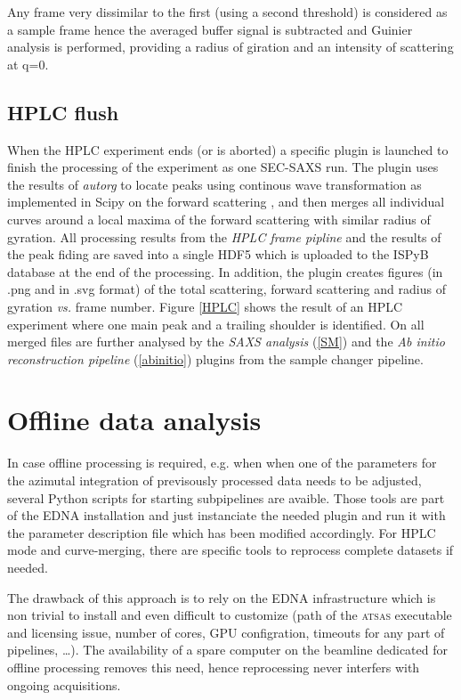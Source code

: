 \documentclass[preprint,pdf]{iucr}              %
\begin{document}
Any frame very dissimilar to the first (using a second threshold) is considered
as a sample frame hence the averaged buffer signal is subtracted and Guinier
analysis is performed, providing a radius of giration and an intensity of
scattering at q=0. 

\subsection{HPLC flush}
When the HPLC experiment ends (or is aborted) a specific plugin is launched to
finish the processing of the experiment as one SEC-SAXS run. 
The plugin uses the results of \textit{autorg} to locate peaks using continous
wave transformation as implemented in Scipy on the forward scattering
\cite{cwt, scipy}, and then merges all individual curves around a local maxima
of the forward scattering with similar radius of gyration. 
All processing results from the \textit{HPLC frame pipline} and the results of 
the peak fiding are saved into a single HDF5 which is uploaded to the ISPyB
database at the end of the processing. 
In addition, the plugin creates figures (in .png and in .svg format) of the
total scattering, forward scattering and radius of gyration \textit{vs.} frame
number. 
Figure \ref{HPLC} shows the result of an HPLC experiment where one main peak and
a trailing shoulder is identified. 
On all merged files are further analysed by the \textit{SAXS analysis}
(\ref{SM}) and the \textit{Ab initio reconstruction pipeline}
(\ref{abinitio}) plugins from the sample changer pipeline.

\section{Offline data analysis}
In case offline processing is required, e.g. when when one of the parameters for
the azimutal integration of previsously processed data needs to be adjusted, 
several Python scripts for starting subpipelines are avaible. 
Those tools are part of the EDNA installation and just instanciate the needed
plugin and run it with the parameter description file which has been modified
accordingly. 
For HPLC mode and curve-merging, there are specific tools to reprocess complete
datasets if needed.

The drawback of this approach is to rely on the EDNA infrastructure which is
non trivial to install and even difficult to customize (path of the
\textsc{atsas} executable and licensing issue, number of cores, GPU
configration, timeouts for any part of pipelines, \ldots). 
The availability of a spare computer on the beamline dedicated for offline
processing removes this need, hence reprocessing never interfers with ongoing
acquisitions.
\end{document}
